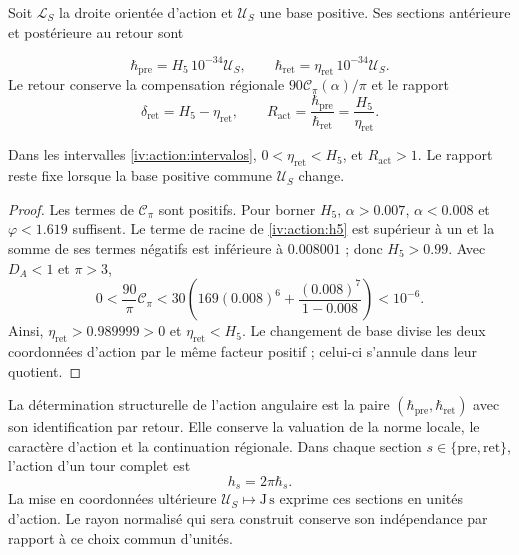 Soit \(\mathcal L_S\) la droite orientée d’action et
\(\mathcal U_S\) une base positive. Ses sections antérieure et
postérieure au retour sont

\begin{equation}
 \hbar_{\mathrm{pre}}=H_5\,10^{-34}\mathcal U_S,\qquad
 \hbar_{\mathrm{ret}}=\eta_{\mathrm{ret}}\,10^{-34}\mathcal U_S.
 \label{iv:action:hbar}
\end{equation}
Le retour conserve la compensation régionale
\(90\mathcal C_\pi(\alpha)/\pi\) et le rapport
\begin{equation}
 \delta_{\mathrm{ret}}=H_5-\eta_{\mathrm{ret}},\qquad
 R_{\mathrm{act}}=\frac{\hbar_{\mathrm{pre}}}
                        {\hbar_{\mathrm{ret}}}
                =\frac{H_5}{\eta_{\mathrm{ret}}}.
 \label{iv:action:razon}
\end{equation}

\begin{proposition}
\label{iv:action:positividad}
Dans les intervalles \eqref{iv:action:intervalos},
\(0<\eta_{\mathrm{ret}}<H_5\), et \(R_{\mathrm{act}}>1\).
Le rapport reste fixe lorsque la base positive commune
\(\mathcal U_S\) change.
\end{proposition}
\begin{proof}
Les termes de \(\mathcal C_\pi\) sont positifs. Pour borner
\(H_5\), \(\alpha>0.007\), \(\alpha<0.008\) et
\(\varphi<1.619\) suffisent. Le terme de racine de \eqref{iv:action:h5}
est supérieur à un et la somme de ses termes négatifs est inférieure
à \(0.008001\) ; donc \(H_5>0.99\).
Avec \(D_A<1\) et \(\pi>3\),
\[
 0<\frac{90}{\pi}\mathcal C_\pi
 <30\left(169(0.008)^6+
             \frac{(0.008)^7}{1-0.008}\right)<10^{-6}.
\]
Ainsi, \(\eta_{\mathrm{ret}}>0.989999>0\) et
\(\eta_{\mathrm{ret}}<H_5\). Le changement de base divise les deux
coordonnées d’action par le même facteur positif ; celui-ci
s’annule dans leur quotient.

\end{proof}

La détermination structurelle de l’action angulaire est la paire
\((\hbar_{\mathrm{pre}},\hbar_{\mathrm{ret}})\) avec son
identification par retour. Elle conserve la valuation de la norme
locale, le caractère d’action et la continuation régionale.
Dans chaque section \(s\in\{\mathrm{pre},\mathrm{ret}\}\), l’action
d’un tour complet est
\begin{equation}
 h_s=2\pi\hbar_s.
 \label{iv:action:vuelta}
\end{equation}
La mise en coordonnées ultérieure \(\mathcal U_S\mapsto\mathrm{J\,s}\) exprime
ces sections en unités d’action. Le rayon normalisé qui
sera construit conserve son indépendance par rapport à ce choix
commun d’unités.
